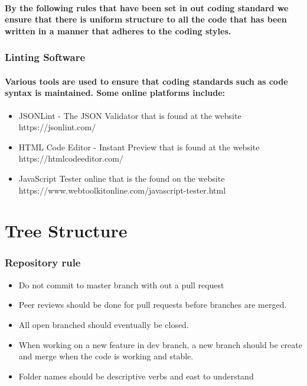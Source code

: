 \documentclass[10pt]{article}
\begin{document}
    \paragraph{By the following rules that have been set in out coding standard we ensure that there is  uniform structure to all the code that has been written in a manner that adheres to the coding styles.}
    \subsubsection{Linting Software}
    \paragraph{Various tools are used to ensure that coding standards such as code syntax is maintained. Some online platforms include: }
    \begin{itemize}
        \item JSONLint - The JSON Validator that is found at the website https://jsonlint.com/
        \item HTML Code Editor - Instant Preview that is found at the website https://htmlcodeeditor.com/
        \item JavaScript Tester online that is the found on the website https://www.webtoolkitonline.com/javascript-tester.html
    \end{itemize}
    \paragraph{
    }
    
    
    \section{Tree Structure}
    \subsubsection{Repository rule}
    \begin{itemize}
        \item Do not commit to master branch with out a pull request
        \item Peer reviews should be done for pull requests before branches are merged. 
        \item All open branched should eventually be closed.
        \item When working on a new feature in dev branch, a new branch should be create and merge when the code is working and stable.
        \item Folder names should be descriptive verbs and east to understand
         
    \end{itemize}
    
	\newpage
	
    
\end{document}
